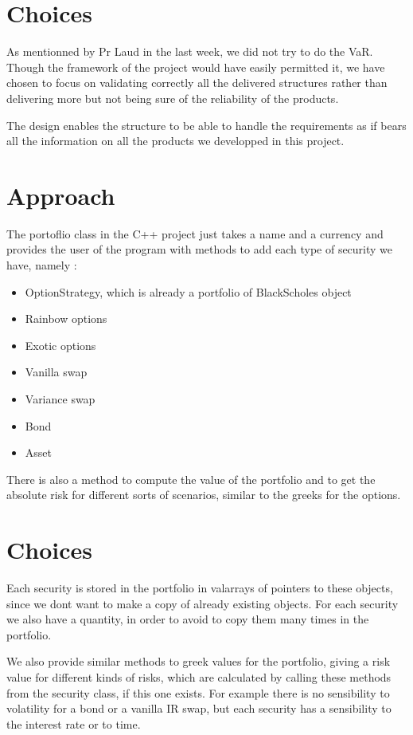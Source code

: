 \section{Choices }

As mentionned by Pr Laud in the last week, we did not try to do the VaR. Though the framework of the project would have easily permitted it, we have chosen to focus on validating correctly all the delivered structures rather than delivering more but not being sure of the reliability of the products.

The design enables the structure to be able to handle the requirements as if bears all the information on all the products we developped in this project.

\section{Approach}
The portoflio class in the C++ project just takes a name and a currency and provides the user of the program with methods to add 
each type of security we have, namely :
\begin{itemize}
	\item OptionStrategy, which is already a portfolio of BlackScholes object
	\item Rainbow options
	\item Exotic options
	\item Vanilla swap
	\item Variance swap
	\item Bond
	\item Asset
\end{itemize}

There is also a method to compute the value of the portfolio and to get the absolute risk for different sorts of scenarios, similar to the greeks for the options.

\section{Choices}
Each security is stored in the portfolio in valarrays of pointers to these objects, since we dont want to make a copy of already existing objects. For each security we also have a quantity, in order to avoid to copy them many times in the portfolio.
\par We also provide similar methods to greek values for the portfolio, giving a risk value for different kinds 
of risks, which are calculated by calling these methods from the security class, if this one exists. For example there is no sensibility 
to volatility for a bond or a vanilla IR swap, but each security has a sensibility to the interest rate or to time.




